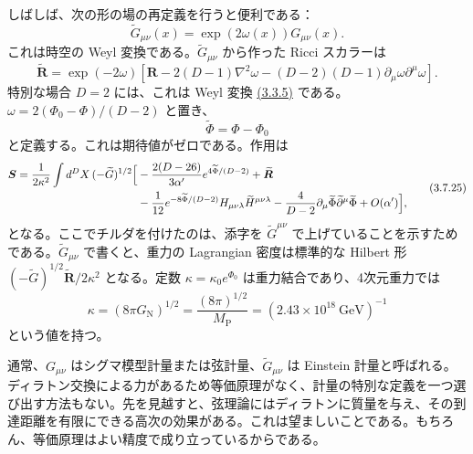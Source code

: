 しばしば、次の形の場の再定義を行うと便利である：
\begin{equation}
\widetilde G_{\mu\nu}(x)=\exp(2\omega(x))G_{\mu\nu}(x).
\tag{3.7.22}\label{eq:3.7.22}
\end{equation}
これは時空の Weyl 変換である。$\widetilde G_{\mu\nu}$ から作った Ricci スカラーは
\begin{equation}
\widetilde{\bm R}=\exp(-2\omega)
\left[\bm R-2(D-1)\nabla^2\omega
-(D-2)(D-1)\partial_\mu\omega\partial^\mu\omega\right].
\tag{3.7.23}\label{eq:3.7.23}
\end{equation}
特別な場合 $D=2$ には、これは Weyl 変換 \hyperref[eq:3.3.5]{(3.3.5)} である。$\omega=2(\Phi_0-\Phi)/(D-2)$ と置き、
\begin{equation}
\widetilde\Phi=\Phi-\Phi_0
\tag{3.7.24}\label{eq:3.7.24}
\end{equation}
と定義する。これは期待値がゼロである。作用は
\begin{equation}
\begin{aligned}
\bm S=\frac1{2\kappa^2}\int d^DX\,(-\widetilde G)^{1/2}
\Bigl[&-\frac{2(D-26)}{3\alpha'}
e^{4\widetilde\Phi/(D-2)}+\widetilde{\bm R}\\
&-\frac1{12}e^{-8\widetilde\Phi/(D-2)}
H_{\mu\nu\lambda}\widetilde H^{\mu\nu\lambda}
-\frac4{D-2}\partial_\mu\widetilde\Phi
\widetilde\partial^\mu\widetilde\Phi+O(\alpha')\Bigr],
\end{aligned}
\tag{3.7.25}\label{eq:3.7.25}
\end{equation}
となる。ここでチルダを付けたのは、添字を $\widetilde G^{\mu\nu}$ で上げていることを示すためである。$\widetilde G_{\mu\nu}$ で書くと、重力の Lagrangian 密度は標準的な Hilbert 形 $(-\widetilde G)^{1/2}\widetilde{\bm R}/2\kappa^2$ となる。定数 $\kappa=\kappa_0e^{\Phi_0}$ は重力結合であり、4次元重力では
\begin{equation}
\kappa=(8\pi G_{\mathrm N})^{1/2}
=\frac{(8\pi)^{1/2}}{M_{\mathrm P}}
=(2.43\times10^{18}\ \mathrm{GeV})^{-1}
\tag{3.7.26}\label{eq:3.7.26}
\end{equation}
という値を持つ。

通常、$G_{\mu\nu}$ はシグマ模型計量または弦計量、$\widetilde G_{\mu\nu}$ は Einstein 計量と呼ばれる。ディラトン交換による力があるため等価原理がなく、計量の特別な定義を一つ選び出す方法もない。先を見越すと、弦理論にはディラトンに質量を与え、その到達距離を有限にできる高次の効果がある。これは望ましいことである。もちろん、等価原理はよい精度で成り立っているからである。

